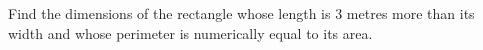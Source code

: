 Find the dimensions of the rectangle whose length is $3$ metres more than its width and whose perimeter is numerically equal to its area.
